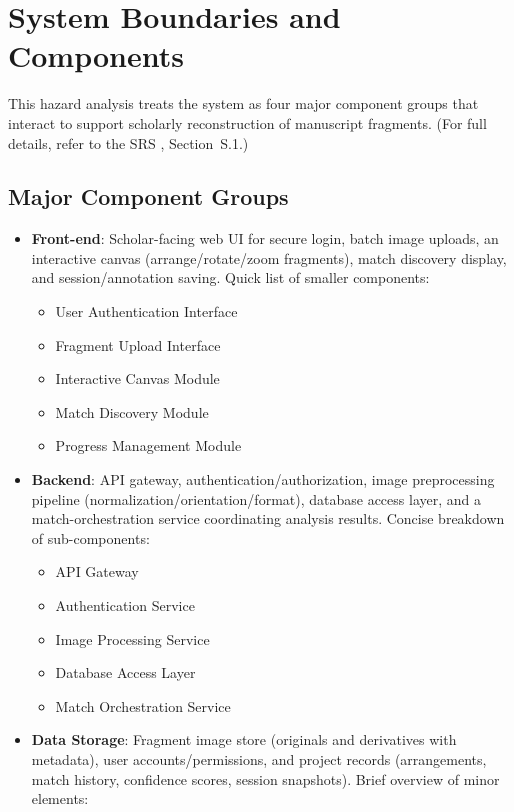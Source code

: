 \documentclass{article}
\begin{document}
\section{System Boundaries and Components}

This hazard analysis treats the system as four major component groups that interact to support scholarly reconstruction of manuscript fragments. (For full details, refer to the SRS \citep{SRS-Sanskrit-Ciphers}, Section~S.1.)

\subsection*{Major Component Groups}
\begin{itemize}
  \item \textbf{Front-end}: Scholar-facing web UI for secure login, batch image uploads, an interactive canvas (arrange/rotate/zoom fragments), match discovery display, and session/annotation saving. Quick list of smaller components:
  \begin{itemize}
    \item User Authentication Interface
    \item Fragment Upload Interface
    \item Interactive Canvas Module
    \item Match Discovery Module
    \item Progress Management Module
  \end{itemize}
  \item \textbf{Backend}: API gateway, authentication/authorization, image preprocessing pipeline (normalization/orientation/format), database access layer, and a match-orchestration service coordinating analysis results. Concise breakdown of sub-components:
   \begin{itemize}
    \item API Gateway
    \item Authentication Service
    \item Image Processing Service
    \item Database Access Layer
    \item Match Orchestration Service
   \end{itemize}
  \item \textbf{Data Storage}: Fragment image store (originals and derivatives with metadata), user accounts/permissions, and project records (arrangements, match history, confidence scores, session snapshots). Brief overview of minor elements:
  \begin{itemize}

\end{itemize}
\end{itemize}
\end{document}
